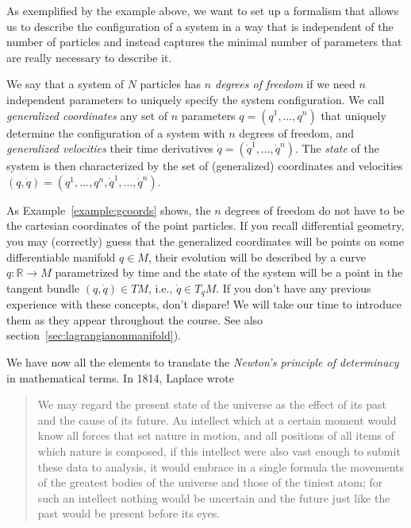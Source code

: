 \documentclass[english,fontsize=11pt,paper=b5]{scrbook}
\theoremstyle{definition}
\begin{document}
  As exemplified by the example above, we want to set up a formalism that allows us to describe the configuration of a system in a way that is independent of the number of particles and instead captures the minimal number of parameters that are really necessary to describe it.

  We say that a system of $N$ particles has \emph{$n$ degrees of freedom}  if we need $n$ independent parameters to uniquely specify the system configuration.
  We call \emph{generalized coordinates} any set of $n$ parameters $q = (q^1, \ldots, q^n)$ that uniquely determine the configuration of a system with $n$ degrees of freedom, and \emph{generalized velocities}  their time derivatives $\dot q = (\dot q^1, \ldots, \dot q^n)$.
  The \emph{state}  of the system is then characterized by the set of (generalized) coordinates and velocities $(q, \dot q) = \left(q^1, \ldots, q^n,\dot q^1, \ldots, \dot q^n\right)$.

  As Example~\ref{example:gcoords} shows, the $n$ degrees of freedom do not have to be the cartesian coordinates of the point particles.
  If you recall differential geometry, you may (correctly) guess that the generalized coordinates will be points on some differentiable manifold $q\in M$, their evolution will be described by a curve $q: \mathbb{R} \to M$ parametrized by time and the state of the system will be a point in the tangent bundle $(q, \dot q)\in TM$, i.e., $\dot q \in T_q M$. If you don't have any previous experience with these concepts, don't dispare! We will take our time to introduce them as they appear throughout the course. See also section~\ref{sec:lagrangianonmanifold}).
  \medskip

  We have now all the elements to translate the \emph{Newton's principle of determinacy}  in mathematical terms.
  In 1814, Laplace \cite{book:laplace} wrote

  \begin{quotation}
    We may regard the present state of the universe as the effect of its past and the cause of its future. An intellect which at a certain moment would know all forces that set nature in motion, and all positions of all items of which nature is composed, if this intellect were also vast enough to submit these data to analysis, it would embrace in a single formula the movements of the greatest bodies of the universe and those of the tiniest atom; for such an intellect nothing would be uncertain and the future just like the past would be present before its eyes.
  \end{quotation}
\end{document}
